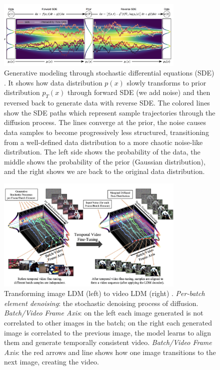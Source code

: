\begin{figure}
    \centering
    \includegraphics[width=0.8\textwidth]{images/video_ldm/ddpm_sde.png}
    \caption{Generative modeling through stochastic differential equations (SDE) \cite{song2020score}. It shows how data distribution $p(x)$ slowly transforms to prior distribution $p_T(x)$ through forward SDE (we add noise) and then reversed back to generate data with reverse SDE. The colored lines show the SDE paths which represent sample trajectories through the diffusion process. The lines converge at the prior, the noise causes data samples to become progressively less structured, transitioning from a well-defined data distribution to a more chaotic noise-like distribution. The left side shows the probability of the data, the middle shows the probability of the prior (Gaussian distribution), and the right shows we are back to the original data distribution.}
\end{figure}

\begin{figure}
    \centering
    \includegraphics[width=0.8\textwidth]{images/video_ldm/image_to_video_tuning.png}
    \caption{Transforming image LDM (left) to video LDM (right) \cite{video_ldm}. \textit{Per-batch element denoising}: the stochastic denoising process of diffusion. \textit{Batch/Video Frame Axis}: on the left each image generated is not correlated to other images in the batch; on the right each generated image is correlated to the previous image, the model learns to align them and generate temporally consistent video. \textit{Batch/Video Frame Axis}: the red arrows and line shows how one image transitions to the next image, creating the video.}
    \label{fig:video_ldm_image_to_video_tuning}
\end{figure}





